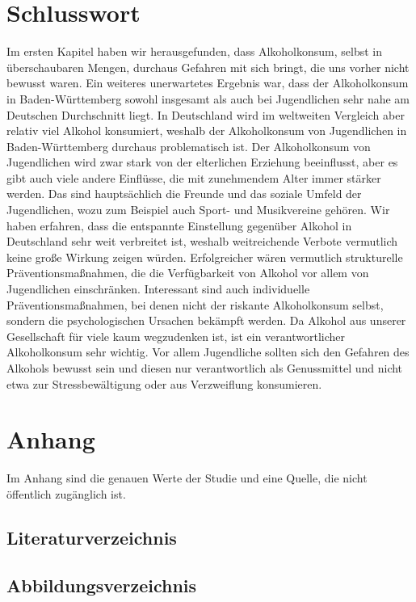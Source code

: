 \documentclass[12pt]{article}
\begin{document}
\clearpage
\section{Schlusswort}
Im ersten Kapitel haben wir herausgefunden, dass Alkoholkonsum, selbst in überschaubaren Mengen, durchaus Gefahren mit sich bringt, die uns vorher nicht bewusst waren. Ein weiteres unerwartetes Ergebnis war, dass der Alkoholkonsum in Baden-Württemberg sowohl insgesamt als auch bei Jugendlichen sehr nahe am Deutschen Durchschnitt liegt. In Deutschland wird im weltweiten Vergleich aber relativ viel Alkohol konsumiert, weshalb der Alkoholkonsum von Jugendlichen in Baden-Württemberg durchaus problematisch ist. Der Alkoholkonsum von Jugendlichen wird zwar stark von der elterlichen Erziehung beeinflusst, aber es gibt auch viele andere Einflüsse, die mit zunehmendem Alter immer stärker werden. Das sind hauptsächlich die Freunde und das soziale Umfeld der Jugendlichen, wozu zum Beispiel auch Sport- und Musikvereine gehören. Wir haben erfahren, dass die entspannte Einstellung gegenüber Alkohol in Deutschland sehr weit verbreitet ist, weshalb weitreichende Verbote vermutlich keine große Wirkung zeigen würden. Erfolgreicher wären vermutlich strukturelle Präventionsmaßnahmen, die die Verfügbarkeit von Alkohol vor allem von Jugendlichen einschränken. Interessant sind auch individuelle Präventionsmaßnahmen, bei denen nicht der riskante Alkoholkonsum selbst, sondern die psychologischen Ursachen bekämpft werden. Da Alkohol aus unserer Gesellschaft für viele kaum wegzudenken ist, ist ein verantwortlicher Alkoholkonsum sehr wichtig. Vor allem Jugendliche sollten sich den Gefahren des Alkohols bewusst sein und diesen nur verantwortlich als Genussmittel und nicht etwa zur Stressbewältigung oder aus Verzweiflung konsumieren.






\clearpage
\section{Anhang}
Im Anhang sind die genauen Werte der Studie und eine Quelle, die nicht öffentlich zugänglich ist.
\clearpage
\subsection{Literaturverzeichnis}
\printbibliography[heading=none]
\subsection{Abbildungsverzeichnis}
\makeatletter{}\makeatother
\lofwithouttitle


\end{document}

